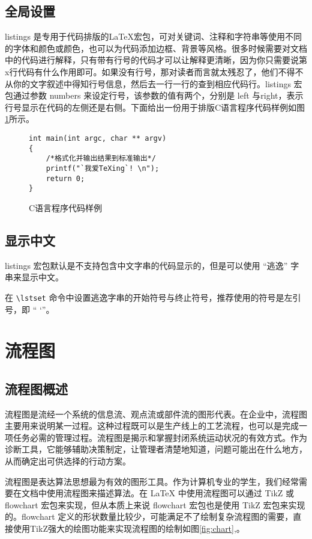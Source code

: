 \subsection{全局设置}
listings 是专用于代码排版的\LaTeX{}宏包，可对关键词、注释和字符串等使用不同的字体和颜色或颜色，也可以为代码添加边框、背景等风格。很多时候需要对文档中的代码进行解释，只有带有行号的代码才可以让解释更清晰，因为你只需要说第 x行代码有什么作用即可。如果没有行号，那对读者而言就太残忍了，他们不得不从你的文字叙述中得知行号信息，然后去一行一行的查到相应代码行。listings 宏包通过参数 numbers 来设定行号，该参数的值有两个，分别是 left 与right，表示行号显示在代码的左侧还是右侧。下面给出一份用于排版C语言程序代码样例如图\ref{fig:code}所示。
\begin{figure}[htb!]
	\centering
	\begin{lstlisting}[language={[ANSI]C}] 
int main(int argc, char ** argv) 
{ 
    /*格式化并输出结果到标准输出*/
    printf("`我爱TeXing`! \n"); 
    return 0; 
} 
	\end{lstlisting} 
	\caption{C语言程序代码样例}
	\label{fig:code}
\end{figure}

\subsection{显示中文}
listings 宏包默认是不支持包含中文字串的代码显示的，但是可以使用 “逃逸” 字串来显示中文。

在 \verb|\lstset| 命令中设置逃逸字串的开始符号与终止符号，推荐使用的符号是左引号，即 “ `”。

\section{流程图}

\subsection{流程图概述}

流程图是流经一个系统的信息流、观点流或部件流的图形代表。在企业中，流程图主要用来说明某一过程。这种过程既可以是生产线上的工艺流程，也可以是完成一项任务必需的管理过程。流程图是揭示和掌握封闭系统运动状况的有效方式。作为诊断工具，它能够辅助决策制定，让管理者清楚地知道，问题可能出在什么地方，从而确定出可供选择的行动方案。

流程图是表达算法思想最为有效的图形工具。作为计算机专业的学生，我们经常需要在文档中使用流程图来描述算法。在 LaTeX 中使用流程图可以通过 TikZ 或 flowchart 宏包来实现，但从本质上来说 flowchart 宏包也是使用 TikZ 宏包来实现的。flowchart 定义的形状数量比较少，可能满足不了绘制复杂流程图的需要，直接使用TikZ强大的绘图功能来实现流程图的绘制如图\ref{fig:chart},。

